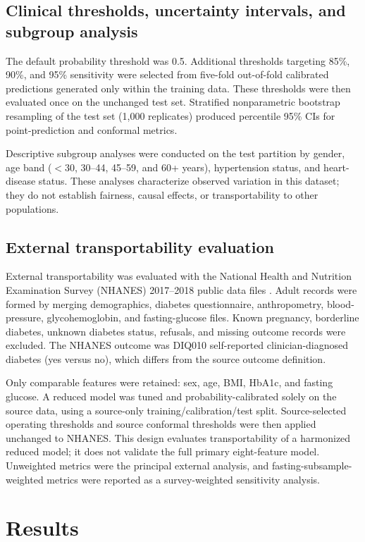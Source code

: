 \documentclass{ieeeaccess}
\begin{document}
\subsection{Clinical thresholds, uncertainty intervals, and subgroup analysis}
The default probability threshold was 0.5. Additional thresholds targeting 85\%, 90\%, and 95\% sensitivity were selected from five-fold out-of-fold calibrated predictions generated only within the training data. These thresholds were then evaluated once on the unchanged test set. Stratified nonparametric bootstrap resampling of the test set (1,000 replicates) produced percentile 95\% CIs for point-prediction and conformal metrics.

Descriptive subgroup analyses were conducted on the test partition by gender, age band ($<$30, 30--44, 45--59, and 60+ years), hypertension status, and heart-disease status. These analyses characterize observed variation in this dataset; they do not establish fairness, causal effects, or transportability to other populations.

\subsection{External transportability evaluation}
External transportability was evaluated with the National Health and Nutrition Examination Survey (NHANES) 2017--2018 public data files \cite{nhanes2018overview,nhanes2018glu}. Adult records were formed by merging demographics, diabetes questionnaire, anthropometry, blood-pressure, glycohemoglobin, and fasting-glucose files. Known pregnancy, borderline diabetes, unknown diabetes status, refusals, and missing outcome records were excluded. The NHANES outcome was DIQ010 self-reported clinician-diagnosed diabetes (yes versus no), which differs from the source outcome definition.

Only comparable features were retained: sex, age, BMI, HbA1c, and fasting glucose. A reduced model was tuned and probability-calibrated solely on the source data, using a source-only training/calibration/test split. Source-selected operating thresholds and source conformal thresholds were then applied unchanged to NHANES. This design evaluates transportability of a harmonized reduced model; it does not validate the full primary eight-feature model. Unweighted metrics were the principal external analysis, and fasting-subsample-weighted metrics were reported as a survey-weighted sensitivity analysis.

\section{Results}
\end{document}
